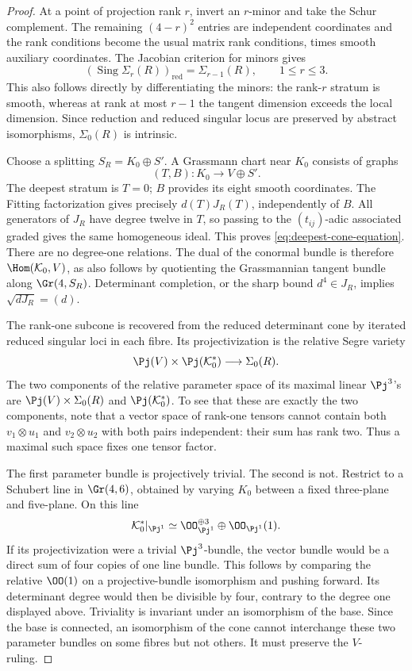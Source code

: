 \begin{proof}
At a point of projection rank \(r\), invert an \(r\)-minor
and take the Schur complement.  The remaining \((4-r)^2\)
entries are independent coordinates and the rank conditions become
the usual matrix rank conditions, times smooth auxiliary coordinates.
The Jacobian criterion for minors gives
\[
 (\operatorname{Sing}\Sigma_r(R))_{\mathrm{red}}
       =\Sigma_{r-1}(R),\qquad 1\le r\le3.
\]
This also follows directly by differentiating the minors: the
rank-\(r\) stratum is smooth, whereas at rank at most \(r-1\)
the tangent dimension exceeds the local dimension.  Since reduction
and reduced singular locus are preserved by abstract isomorphisms,
\(\Sigma_0(R)\) is intrinsic.

Choose a splitting \(S_R=K_0\oplus S'\).  A Grassmann chart
near \(K_0\) consists of graphs
\[
 (T,B):K_0\longrightarrow V\oplus S'.
\]
The deepest stratum is \(T=0\); \(B\) provides its eight
smooth coordinates.  The Fitting factorization gives precisely
\(d(T)J_R(T)\), independently of \(B\).  All generators of
\(J_R\) have degree twelve in \(T\), so passing to the
\((t_{ij})\)-adic associated graded gives the same homogeneous
ideal.  This proves \eqref{eq:deepest-cone-equation}.  There are
no degree-one relations.  The dual of the conormal bundle is therefore
\(\Hom(\mathcal K_0,V)\), as also follows by quotienting the
Grassmannian tangent bundle along \(\Gr(4,S_R)\).  Determinant
completion, or the sharp bound \(d^4\in J_R\), implies
\(\sqrt{dJ_R}=(d)\).

The rank-one subcone is recovered from the reduced determinant cone
by iterated reduced singular loci in each fibre.  Its projectivization
is the relative Segre variety
\[
 \Pj(V)\times\Pj(\mathcal K_0^*)
          \longrightarrow\Sigma_0(R).
\]
The two components of the relative parameter space of its maximal
linear \(\Pj^3\)'s are \(\Pj(V)\times\Sigma_0(R)\)
and \(\Pj(\mathcal K_0^*)\).  To see that these are exactly
the two components, note that a vector space of rank-one tensors
cannot contain both \(v_1\otimes u_1\) and
\(v_2\otimes u_2\) with both pairs independent: their sum has
rank two.  Thus a maximal such space fixes one tensor factor.

The first parameter bundle is projectively trivial.  The second is
not.  Restrict to a Schubert line in \(\Gr(4,6)\), obtained by
varying \(K_0\) between a fixed three-plane and five-plane.  On
this line
\[
 \mathcal K_0^*|_{\Pj^1}\simeq
 \OO_{\Pj^1}^{\oplus3}\oplus\OO_{\Pj^1}(1).
\]
If its projectivization were a trivial \(\Pj^3\)-bundle, the
vector bundle would be a direct sum of four copies of one line
bundle.  This follows by comparing the relative \(\OO(1)\)
on a projective-bundle isomorphism and pushing forward.  Its
determinant degree would then be divisible by four, contrary to the
degree one displayed above.  Triviality is invariant under an
isomorphism of the base.  Since the base is connected, an isomorphism
of the cone cannot interchange these two parameter bundles on some
fibres but not others.  It must preserve the \(V\)-ruling.
\end{proof}

